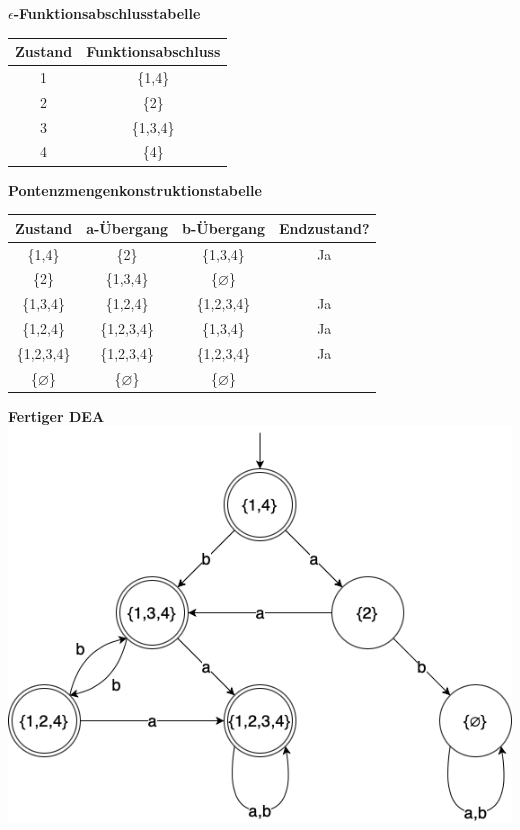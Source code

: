 	
	\textbf{$\epsilon$-Funktionsabschlusstabelle}
		
	\begin{tabular}{|c|c|}
		\hline
		\textbf{Zustand}  & \textbf{Funktionsabschluss} \\
		\hline
		1                 & \{1,4\} \\
		\hline
		2                 & \{2\} \\
		\hline
		3                 & \{1,3,4\}  \\
		\hline
		4                 & \{4\} \\
		\hline
	\end{tabular}
	
	\textbf{Pontenzmengenkonstruktionstabelle}
	
	\begin{tabular}{|c|c|c|c|}
		\hline
		\textbf{Zustand} & \textbf{a-Übergang} & \textbf{b-Übergang} & \textbf{Endzustand?} \\
		\hline
		\{1,4\}     & \{2\}       & \{1,3,4\}         & Ja \\
		\hline
		\{2\}       & \{1,3,4\}   & \{$\varnothing$\} &    \\
		\hline
		\{1,3,4\}   & \{1,2,4\}   & \{1,2,3,4\}       & Ja \\
		\hline
		\{1,2,4\}   & \{1,2,3,4\} & \{1,3,4\}         & Ja \\
		\hline
		\{1,2,3,4\} & \{1,2,3,4\} & \{1,2,3,4\}       & Ja \\
		\hline
		\{$\varnothing$\}       & \{$\varnothing$\}   & \{$\varnothing$\} &    \\
		\hline
	\end{tabular}	
	
	\textbf{Fertiger DEA} \\
	
	\includegraphics[scale=0.5]{thinf/sol/f23t1/NEA-DEA}
	


\newpage
